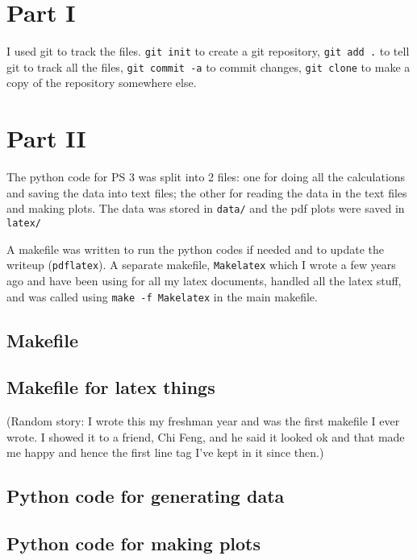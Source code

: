 \documentclass[12pt, oneside, letterpaper, fleqn]{article}
\begin{document}
\section{Part I}
I used git to track the files. \texttt{git init} to create a git
repository, \texttt{git add .} to tell git to track all the files,
\texttt{git commit -a} to commit changes, \texttt{git clone} to make a
copy of the repository somewhere else.

\section{Part II}
The python code for PS 3 was split into 2 files: one for doing all the
calculations and saving the data into text files; the other for reading
the data in the text files and making plots. The data was stored in
\texttt{data/} and the pdf plots were saved in \texttt{latex/}

A makefile was written to run the python codes if needed and to update
the writeup (\texttt{pdflatex}). A separate makefile, \texttt{Makelatex}
which I wrote a few years ago and have been using for all my latex
documents, handled all the latex stuff, and was called using
\texttt{make -f Makelatex} in the main makefile.

\subsection{Makefile}
\lstset{language = [gnu]make}


\subsection{Makefile for latex things}
(Random story: I wrote this my freshman year and was the first makefile
I ever wrote.  I showed it to a friend, Chi Feng, and he said it looked
ok and that made me happy and hence the first line tag I've kept in it
since then.)
\lstset{language = [gnu]make}


\subsection{Python code for generating data}


\subsection{Python code for making plots}

\end{document}
